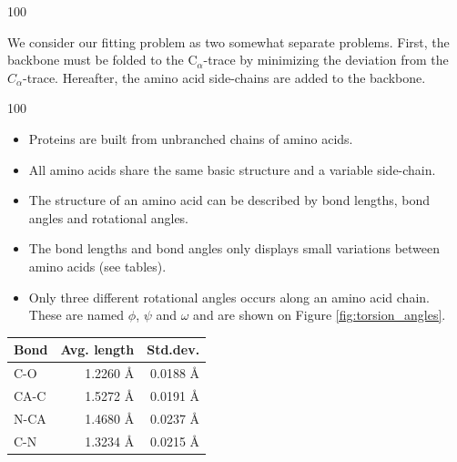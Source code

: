 \documentclass[a0,portrait]{a0poster}
\newcommand{\Ca}{C$_{\alpha}${}}
\begin{document}
\begin{GridBlock}{0}{21}{100}
\begin{multicols}{3}
We consider our fitting problem as two somewhat separate problems.
First, the backbone must be folded to the \Ca-trace by minimizing
the deviation from the $C_{\alpha}$-trace.  Hereafter, the amino acid
side-chains are added to the backbone.  



\end{multicols}
\end{GridBlock}

\begin{GridBlockFill}{0}{46.4}{100}

  \begin{multicols}{2}
\begin{minipage}{\linewidth} 
    \begin{multicols}{2}

    \begin{itemize}
    \item Proteins are built from unbranched chains of amino acids.
    \item All amino acids share
      the same basic structure and a variable side-chain.
    \item The structure of an amino acid can be described by bond lengths,
      bond angles and rotational angles.
    \item The bond lengths and bond angles only displays small variations
      between amino acids (see tables).
    \item Only three different rotational angles occurs along an amino
      acid chain. These are named $\phi$, $\psi$ and $\omega$ and are
      shown on Figure \ref{fig:torsion_angles}.
    \end{itemize} 
   \end{multicols}


\begin{multicols}{2}


\begin{minipage}{\linewidth} 
\centering

  \vspace{7mm}
  \begin{tabular}{lrr}
    \multicolumn{1}{c}{Bond} & \multicolumn{1}{c}{Avg. length} & \multicolumn{1}{c}{Std.dev.} \\ \midrule
    C-O   & 1.2260 Å & 0.0188 Å\\
    CA-C  & 1.5272 Å & 0.0191 Å\\
    N-CA  & 1.4680 Å & 0.0237 Å\\
    C-N   & 1.3234 Å & 0.0215 Å\\
  \end{tabular}
  \vspace{4mm}
  \label{tab:average_bond_lengths}
\end{minipage}



\end{multicols}
\end{minipage}
\end{multicols}
\end{GridBlockFill}
\end{document}
